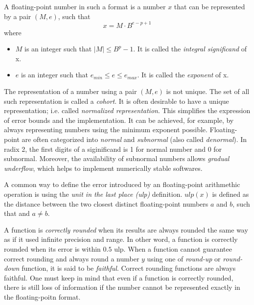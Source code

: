 A floating-point number in such a format is a number $x$ that can be represented by a pair $(M,e)$, such that
\begin{equation}
	x = M \cdot B^{e-p+1}
\end{equation}
where
\begin{itemize}
	\item $M$ is an integer such that $|M| \le B^{p}-1$. It is called the \textit{integral significand} of x.
	\item $e$ is an integer such that $e_{min} \le e \le e_{max}$. It is called the \textit{exponent} of x.
\end{itemize}
The representation of a number using a pair $(M, e)$ is not unique.
The set of all such representation is called a \textit{cohort}.
It is often desirable to have a unique representation; i.e. called \textit{normalized representation}.
This simplifies the expression of error bounds and the implementation.
It can be achieved, for example, by always representing numbers using the minimum exponent possible.
Floating-point are often categorized into \textit{normal} and \textit{subnormal} (also called \textit{denormal}).
In radix 2, the first digits of a siginificand is 1 for normal number and 0 for subnormal.
Moreover, the availability of subnormal numbers allows \textit{gradual underflow},
which helps to implement numerically stable softwares. 
				
A common way to define the error introduced by an floating-point arithmethic
operation is using the \textit{unit in the last place (ulp)} definition.
 $ulp(x)$ is defined as the distance between the two closest distinct
floating-point numbers $a$ and $b$, such that  and $a \neq b$.

A function is \textit{correctly rounded} when its results are always rounded the 
same way as if it used infinite precision and range.
In other word, a function is correctly rounded when its error is within $0.5$ ulp.
When a function cannot guarantee correct rounding and always round a number $y$
using one of \textit{round-up} or \textit{round-down} function, it is said to be \textit{faithful}.
Correct rounding functions are always faithful.
One must keep in mind that even if a function is correctly rounded, there is
still loss of information if the number cannot be represented exactly in the
floating-poitn format.
				
